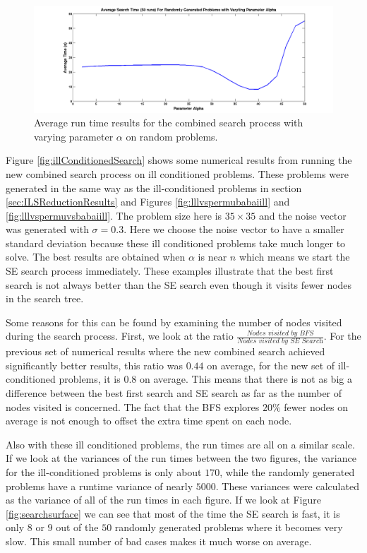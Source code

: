 \documentclass[12pt,Bold,letterpaper]{mcgilletdclass}
\begin{document}
\begin{figure}
\centering
\includegraphics[scale=0.36]{averageSearchTimes.png}
\caption{Average run time results for the combined search process with varying parameter $\alpha$ on random problems.}
\label{fig:searchAverage}
\end{figure}

Figure \ref{fig:illConditionedSearch} shows some numerical results from running the new combined search process on ill conditioned problems. These problems were generated in the same way as the ill-conditioned problems in section \ref{sec:ILSReductionResults} and Figures \ref{fig:lllvspermubabaiill} and \ref{fig:lllvspermuvsbabaiill}. The problem size here is $35 \times 35$ and the noise vector was generated with $\sigma = 0.3$. Here we choose the noise vector to have a smaller standard deviation because these ill conditioned problems take much longer to solve. The best results are obtained when $\alpha$ is near $n$ which means we start the SE search process immediately. These examples illustrate that the best first search is not always better than the SE search even though it visits fewer nodes in the search tree.

Some reasons for this can be found by examining the number of nodes visited during the search process. First, we look at the ratio $\frac{\textit{Nodes visited by BFS}}{\textit{Nodes visited by SE Search}}$. For the previous set of numerical results where the new combined search achieved significantly better results, this ratio was $0.44$ on average, for the new set of ill-conditioned problems, it is $0.8$ on average. This means that there is not as big a difference between the best first search and SE search as far as the number of nodes visited is concerned. The fact that the BFS explores $20\%$ fewer nodes on average is not enough to offset the extra time spent on each node.

Also with these ill conditioned problems, the run times are all on a similar scale. If we look at the variances of the run times between the two figures, the variance for the ill-conditioned problems is only about $170$, while the randomly generated problems have a runtime variance of nearly $5000$. These variances were calculated as the variance of all of the run times in each figure. If we look at Figure \ref{fig:searchsurface} we can see that most of the time the SE search is fast, it is only $8$ or $9$ out of the $50$ randomly generated problems where it becomes very slow. This small number of bad cases makes it much worse on average.
 
\end{document}
